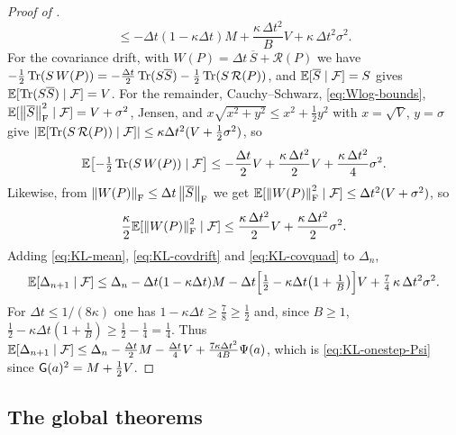\begin{proof}[Proof of ]
\begin{equation}
    \leq-\Delta t(1-\kappa\Delta t)M+\frac{\kappa\,\Delta t^2}BV+\kappa\,\Delta t^2\sigma^2 .
\end{equation}
For the covariance drift, with $W(P)=\Delta t\,\overline S+\mathcal R(P)$ we have
$-\tfrac12\operatorname{Tr}(S\,W(P))=-\tfrac{\Delta t}2\operatorname{Tr}(S\overline S)-\tfrac12\operatorname{Tr}(S\,\mathcal R(P))$, and
$\mathbb{E}[\overline S\mid\mathcal{F}]=S$ gives $\mathbb{E}[\operatorname{Tr}(S\overline S)\mid\mathcal{F}]=V$. For the remainder,
Cauchy--Schwarz, \eqref{eq:Wlog-bounds}, $\mathbb{E}[\left\lVert \overline S\right\rVert_{\mathrm{F}}^2\mid\mathcal{F}]=V+\sigma^2$,
Jensen, and $x\sqrt{x^2+y^2}\leq x^2+\tfrac12y^2$ with $x=\sqrt V$, $y=\sigma$ give
$|\mathbb{E}[\operatorname{Tr}(S\,\mathcal R(P))\mid\mathcal{F}]|\leq\kappa\Delta t^2(V+\tfrac12\sigma^2)$, so
\begin{equation}
\label{eq:KL-covdrift}
    \mathbb{E}\bigl[-\tfrac12\operatorname{Tr}(S\,W(P))\mid\mathcal{F}\bigr]
    \leq-\frac{\Delta t}2V+\frac{\kappa\,\Delta t^2}2V+\frac{\kappa\,\Delta t^2}4\sigma^2 .
\end{equation}
Likewise, from $\left\lVert W(P)\right\rVert_{\mathrm{F}}\leq\Delta t\left\lVert \overline S\right\rVert_{\mathrm{F}}$ we get
$\mathbb{E}[\left\lVert W(P)\right\rVert_{\mathrm{F}}^2\mid\mathcal{F}]\leq\Delta t^2(V+\sigma^2)$, so
\begin{equation}
\label{eq:KL-covquad}
    \frac\kappa2\mathbb{E}[\left\lVert W(P)\right\rVert_{\mathrm{F}}^2\mid\mathcal{F}]\leq\frac{\kappa\,\Delta t^2}2V+\frac{\kappa\,\Delta t^2}2\sigma^2 .
\end{equation}
Adding \eqref{eq:KL-mean}, \eqref{eq:KL-covdrift} and \eqref{eq:KL-covquad} to
$\Delta_n$,
\[
    \mathbb{E}[\Delta_{n+1}\mid\mathcal{F}]
    \leq\Delta_n-\Delta t(1-\kappa\Delta t)M
    -\Delta t\Bigl[\tfrac12-\kappa\Delta t\bigl(1+\tfrac1B\bigr)\Bigr]V
    +\tfrac74\,\kappa\,\Delta t^2\sigma^2 .
\]
For $\Delta t\leq1/(8\kappa)$ one has $1-\kappa\Delta t\geq\tfrac78\geq\tfrac12$ and, since $B\geq1$,
$\tfrac12-\kappa\Delta t(1+\tfrac1B)\geq\tfrac12-\tfrac14=\tfrac14$. Thus
$\mathbb{E}[\Delta_{n+1}\mid\mathcal{F}]\leq\Delta_n-\tfrac{\Delta t}2M-\tfrac{\Delta t}4V+\tfrac{7\kappa\Delta t^2}{4B}\Psi(a)$,
which is \eqref{eq:KL-onestep-Psi} since $\mathsf{G}(a)^2=M+\tfrac12V$.
\end{proof}

\subsection{The global theorems}

